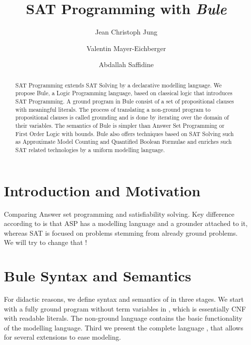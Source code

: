 \documentclass[runningheads]{llncs}
\title{ SAT Programming with \emph{Bule}}
\author{Jean Christoph Jung\inst{1} \and Valentin Mayer-Eichberger\inst{2} \and
Abdallah Saffidine\inst{3}}
\institute{Universit\"at Bremen, Germany \and Technische Universit\"at Berlin, Germany \and University of New South Wales, Sydney, Australia }
\begin{document}
\maketitle

\begin{abstract}
    SAT Programming extends SAT Solving by a declarative modelling language. 
    We propose Bule, a Logic Programming language, based on classical logic that introduces SAT Programming. 
    A ground program in Bule consist of a set of propositional clauses with meaningful literals. 
    The process of translating a non-ground program to propositional clauses is called grounding and is done by iterating over the domain of their variables. 
    The semantics of Bule is simpler than Answer Set Programming or First Order Logic with bounds.  
    Bule also offers techniques based on SAT Solving such as Approximate Model Counting and Quantified Boolean Formulae 
    and enriches such SAT related technologies by a uniform modelling language. 
\end{abstract}

\section{Introduction and Motivation}

Comparing Answer set programming and satisfiability solving. Key difference
according to \cite{Lierler17} is that ASP has a modelling language and a
grounder attached to it, whereas SAT is focused on problems stemming from
already ground problems. We will try to change that !

\section{Bule Syntax and Semantics}

For didactic reasons, we define syntax and semantics of \bule in three stages. 
We start with a fully ground program without term variables in \bflat, which is essentially CNF with readable literals. 
The non-ground language \bcore contains the basic functionality of the modelling language. 
Third we present the complete language \bfull, that allows for several extensions to ease modeling. 
\end{document}
